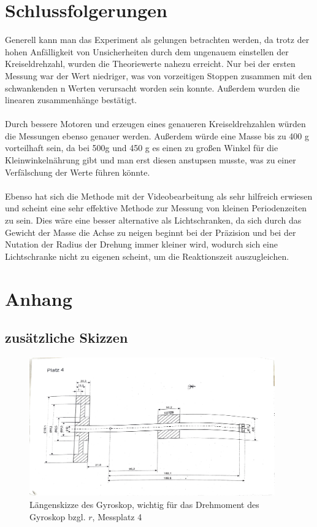 \documentclass[bibliography=totocnumbered]{scrartcl}
\begin{document}
	\section{Schlussfolgerungen}
	Generell kann man das Experiment als gelungen betrachten werden, da trotz der hohen Anfälligkeit von Unsicherheiten durch dem ungenauem einstellen der Kreiseldrehzahl, wurden die Theoriewerte nahezu erreicht. Nur bei der ersten Messung war der Wert niedriger, was von vorzeitigen Stoppen zusammen mit den schwankenden n Werten verursacht worden sein konnte.
	Außerdem wurden die linearen zusammenhänge bestätigt.\\\\
	Durch bessere Motoren und erzeugen eines genaueren Kreiseldrehzahlen würden die Messungen ebenso genauer werden. Außerdem würde eine Masse bis zu 400 g vorteilhaft sein, da bei 500g und 450 g es einen zu großen Winkel für die Kleinwinkelnährung gibt und man erst diesen anstupsen musste, was zu einer Verfälschung der Werte führen könnte.\\\\
	Ebenso hat sich die Methode mit der Videobearbeitung als sehr hilfreich erwiesen und scheint eine sehr effektive Methode zur Messung von kleinen Periodenzeiten zu sein. Dies wäre eine besser alternative als Lichtschranken, da sich durch das Gewicht der Masse die Achse zu neigen beginnt bei der Präzision und bei der Nutation der Radius der Drehung immer kleiner wird, wodurch sich eine Lichtschranke nicht zu eigenen scheint, um die Reaktionszeit auszugleichen.
	
	
	
	
	\newpage
    \appendix
	\section{Anhang}
	
	\subsection{zusätzliche Skizzen}\label{sect: Zusätliche Skizzen}
	
	\begin{figure}[!ht]
		\centering								 
		\includegraphics[width=300pt]{fotos/gpr1/M10.Skizze.pdf}			 
		\caption[Längenskizze Gyroskop, P4]{Längenskizze des Gyroskop, wichtig für das Drehmoment des Gyroskop bzgl. $ r $, Messplatz 4}							 
		\label{Abb: Längenskizze Platz 4}							 
	\end{figure}
	
\end{document}
